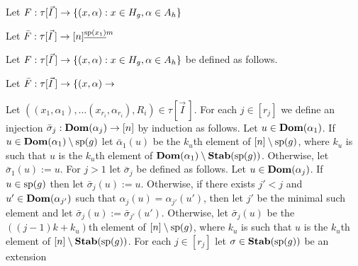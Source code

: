 \documentclass[../main/thesis.tex]{subfiles}
\begin{document}
\pagebreak





Let $F : \tau [\vec{I} \,] \rightarrow \{ (x, \alpha) : x \in H_g, \alpha \in A_h\}$


Let $\bar{F} : \tau [\vec{I} \, ] \rightarrow [n]^{\underline{\text{sp}(x_1)}m{}}$

Let $F : \tau [\vec{I} \,] \rightarrow \{ (x, \alpha) : x \in H_g, \alpha \in A_h\}$ be
defined as follows.

Let $\bar{F} : \tau [\vec{I} \,] \rightarrow \{ (x, \alpha) \rightarrow $

Let $((x_1, \alpha_1), \ldots (x_{r_i}, \alpha_{r_i}), R_i) \in \tau [\vec{I}
\,]$. For each $j \in [r_j]$ we define an injection $\bar{\sigma}_j :
\text{\textbf{Dom}}(\alpha_j) \rightarrow [n]$ by induction as follows. Let $u \in \text{\textbf{Dom}} (\alpha_1)$. If
$u \in \text{\textbf{Dom}}(\alpha_1) \setminus \text{sp}(g)$ let $\bar{\alpha}_1 (u)$ be the
$k_u$th element of $[n] \setminus \text{sp}(g)$, where $k_u$ is such that $u$ is
the $k_u$th element of $\text{\textbf{Dom}}(\alpha_1) \setminus \text{\textbf{Stab}} (\text{sp} (g))$. Otherwise, let
$\bar{\sigma}_1 (u) := u$. For $j > 1$ let $\bar{\sigma}_j$ be defined as
follows. Let $u \in \text{\textbf{Dom}} (\alpha_j)$. If $u \in \text{sp}(g)$ then let
$\bar{\sigma}_j(u) := u$. Otherwise, if there exists $j' < j$ and $u' \in \text{\textbf{Dom}}
(\alpha_{j'})$ such that $\alpha_j (u) = \alpha_{j'}(u')$, then let $j'$ be the
minimal such element and let $\bar{\sigma}_j (u) := \bar{\sigma}_{j'}(u')$.
Otherwise, let $\bar{\sigma}_j (u)$ be the $((j - 1)k + k_u)$th element of $[n]
\setminus \text{sp}(g)$, where $k_u$ is such that $u$ is the $k_u$th element of
$[n] \setminus \text{\textbf{Stab}} (\text{sp} (g))$. For each $j \in [r_j]$ let $\sigma \in \text{\textbf{Stab}} (\text{sp} (g))$
be an extension
\end{document}
